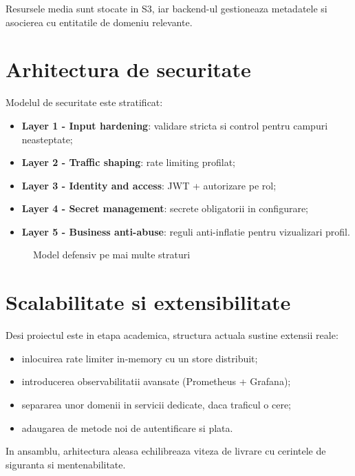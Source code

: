 Resursele media sunt stocate in S3, iar backend-ul gestioneaza metadatele si asocierea cu entitatile de domeniu relevante.

\section{Arhitectura de securitate}

Modelul de securitate este stratificat:
\begin{itemize}[leftmargin=1.2cm]
    \item \textbf{Layer 1 - Input hardening}: validare stricta si control pentru campuri neasteptate;
    \item \textbf{Layer 2 - Traffic shaping}: rate limiting profilat;
    \item \textbf{Layer 3 - Identity and access}: JWT + autorizare pe rol;
    \item \textbf{Layer 4 - Secret management}: secrete obligatorii in configurare;
    \item \textbf{Layer 5 - Business anti-abuse}: reguli anti-inflatie pentru vizualizari profil.
\end{itemize}

\begin{figure}[H]
\centering
{}
\caption{Model defensiv pe mai multe straturi}
\end{figure}

\section{Scalabilitate si extensibilitate}

Desi proiectul este in etapa academica, structura actuala sustine extensii reale:
\begin{itemize}[leftmargin=1.2cm]
    \item inlocuirea rate limiter in-memory cu un store distribuit;
    \item introducerea observabilitatii avansate (Prometheus + Grafana);
    \item separarea unor domenii in servicii dedicate, daca traficul o cere;
    \item adaugarea de metode noi de autentificare si plata.
\end{itemize}

In ansamblu, arhitectura aleasa echilibreaza viteza de livrare cu cerintele de siguranta si mentenabilitate.
